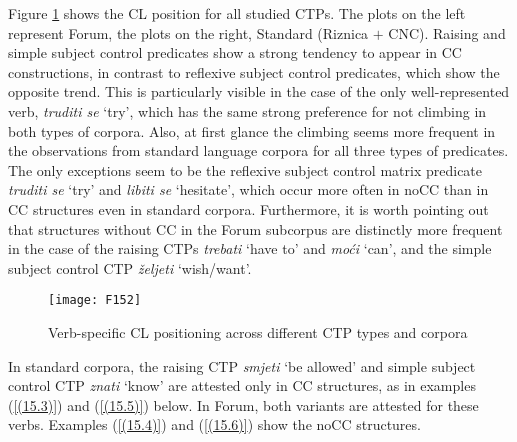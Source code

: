 Figure \ref{F15.2} shows the CL position for all studied CTPs. The plots on the left represent Forum, the plots on the right, Standard (Riznica $+$ CNC). Raising and simple subject control predicates show a strong tendency to appear in CC constructions, in contrast to reflexive subject control predicates, which show the opposite trend. This is particularly visible in the case of the only well-represented verb, \textit{truditi se} ‘try’, which has the same strong preference for not climbing in both types of corpora. Also, at first glance the climbing seems  more frequent in the observations from standard language corpora for all three types of predicates. The only exceptions seem to be the reflexive subject control matrix predicate \textit{truditi se} ‘try’ and \textit{libiti se} `hesitate', which occur more often in noCC than in CC structures even in standard corpora. Furthermore, it is worth pointing out that structures without CC in the Forum subcorpus are distinctly more frequent in the case of the raising CTPs \textit{trebati} ‘have to’ and \textit{moći} ‘can’, and the simple subject control CTP \textit{željeti} ‘wish/want’.

\begin{figure}
\caption{Verb-specific CL positioning across different CTP types and corpora}
\label{F15.2}
\texttt{[image: F152]}
\end{figure}

In standard corpora, the raising CTP \textit{smjeti} ‘be allowed’ and simple subject control CTP \textit{znati} ‘know’ are attested only in CC structures, as in examples (\ref{(15.3)}) and (\ref{(15.5)}) below. In Forum, both variants are attested for these verbs. Examples (\ref{(15.4)}) and (\ref{(15.6)}) show the noCC structures.

